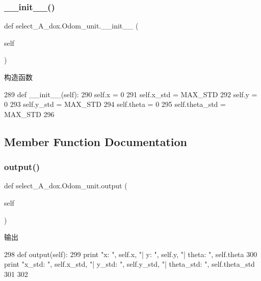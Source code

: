 \subsubsection{\texorpdfstring{\+\_\+\+\_\+init\+\_\+\+\_\+()}{\_\_init\_\_()}}
{\footnotesize\ttfamily def select\+\_\+\+A\+\_\+dox.\+Odom\+\_\+unit.\+\_\+\+\_\+init\+\_\+\+\_\+ (\begin{DoxyParamCaption}\item[{}]{self }\end{DoxyParamCaption})}



构造函数 


\begin{DoxyCode}
289     \textcolor{keyword}{def }\_\_init\_\_(self):
290         self.x = 0
291         self.x\_std = MAX\_STD
292         self.y = 0
293         self.y\_std = MAX\_STD
294         self.theta = 0
295         self.theta\_std = MAX\_STD
296 
\end{DoxyCode}


\subsection{Member Function Documentation}
\mbox{\label{classselect___a__dox_1_1_odom__unit_aae71c1d0731f7d23c8c41c4859831f0b}} 
\subsubsection{\texorpdfstring{output()}{output()}}
{\footnotesize\ttfamily def select\+\_\+\+A\+\_\+dox.\+Odom\+\_\+unit.\+output (\begin{DoxyParamCaption}\item[{}]{self }\end{DoxyParamCaption})}



输出 


\begin{DoxyCode}
298     \textcolor{keyword}{def }output(self):
299         \textcolor{keywordflow}{print} \textcolor{stringliteral}{"x: "}, self.x, \textcolor{stringliteral}{"| y: "}, self.y, \textcolor{stringliteral}{"| theta: "}, self.theta
300         \textcolor{keywordflow}{print} \textcolor{stringliteral}{"x\_std: "}, self.x\_std, \textcolor{stringliteral}{"| y\_std: "}, self.y\_std, \textcolor{stringliteral}{"| theta\_std: "}, self.theta\_std
301 
302 
\end{DoxyCode}


